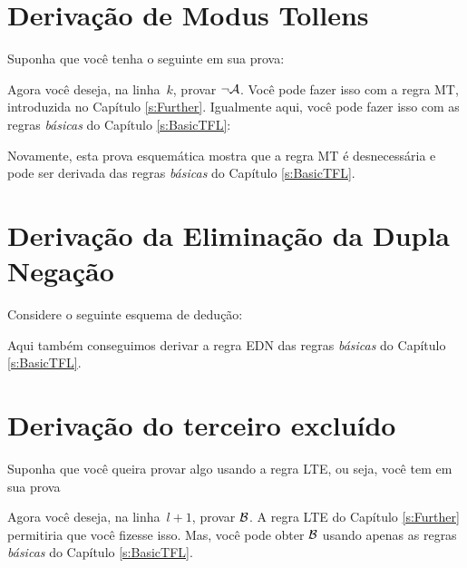 \section{Derivação de Modus Tollens}
Suponha que você tenha o seguinte em sua prova:
\begin{fitchproof}
\end{fitchproof}
Agora você deseja, na linha~$k$, provar $\neg \mathcal{A}$. Você pode fazer isso com a regra  MT, introduzida no Capítulo \ref{s:Further}.  Igualmente aqui, você pode fazer isso com as regras  \emph{básicas} do Capítulo \ref{s:BasicTFL}:
 
\begin{fitchproof}
		\open
		\close
\end{fitchproof}
Novamente, esta prova esquemática mostra que a regra MT é desnecessária e pode ser derivada das regras  \emph{básicas} do Capítulo \ref{s:BasicTFL}.


\section{Derivação da Eliminação da Dupla Negação}
Considere o seguinte esquema de dedução:
	\begin{fitchproof}
	\open
	\close
\end{fitchproof}
Aqui também conseguimos derivar a regra EDN das regras \emph{básicas} do Capítulo \ref{s:BasicTFL}.

\section{Derivação do terceiro excluído}
Suponha que você queira provar algo usando a regra LTE, ou seja, você tem em sua prova
 
\begin{fitchproof}
  \open
  \close
  \open
  \close
\end{fitchproof}
Agora você deseja, na linha~$l+1$, provar $\mathcal{B}$. A regra LTE do Capítulo \ref{s:Further} permitiria que você fizesse isso. Mas, você pode obter $\mathcal{B}$ usando apenas as regras  \emph{básicas} do Capítulo \ref{s:BasicTFL}.

